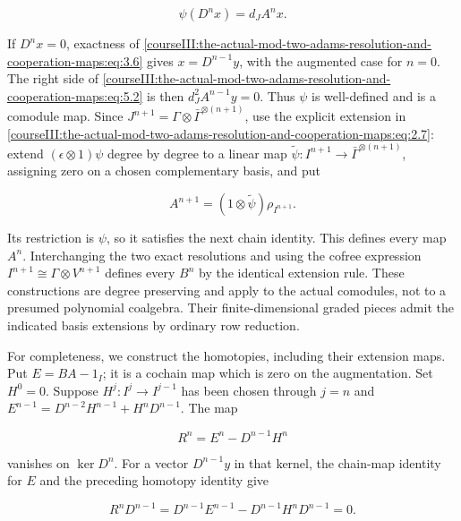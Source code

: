 \begin{equation}
\psi(D^n x)=d_JA^n x.
 \label{courseIII:the-actual-mod-two-adams-resolution-and-cooperation-maps:eq:5.2}
\end{equation}

If \(D^nx=0\), exactness of \eqref{courseIII:the-actual-mod-two-adams-resolution-and-cooperation-maps:eq:3.6} gives \(x=D^{n-1}y\), with the augmented case for \(n=0\). The right side of \eqref{courseIII:the-actual-mod-two-adams-resolution-and-cooperation-maps:eq:5.2} is then \(d_J^2A^{n-1}y=0\). Thus \(\psi\) is well-defined and is a comodule map. Since \(J^{n+1}=\Gamma\otimes\bar\Gamma^{\otimes(n+1)}\), use the explicit extension in \eqref{courseIII:the-actual-mod-two-adams-resolution-and-cooperation-maps:eq:2.7}: extend \((\epsilon\otimes1)\psi\) degree by degree to a linear map \(\widetilde\psi:I^{n+1}\to\bar\Gamma^{\otimes(n+1)}\), assigning zero on a chosen complementary basis, and put

\begin{equation}
A^{n+1}=(1\otimes\widetilde\psi)\rho_{I^{n+1}}.
 \label{courseIII:the-actual-mod-two-adams-resolution-and-cooperation-maps:eq:5.3}
\end{equation}

Its restriction is \(\psi\), so it satisfies the next chain identity. This defines every map \(A^n\). Interchanging the two exact resolutions and using the cofree expression \(I^{n+1}\cong\Gamma\otimes V^{n+1}\) defines every \(B^n\) by the identical extension rule. These constructions are degree preserving and apply to the actual comodules, not to a presumed polynomial coalgebra. Their finite-dimensional graded pieces admit the indicated basis extensions by ordinary row reduction.

For completeness, we construct the homotopies, including their extension maps. Put \(E=BA-1_I\); it is a cochain map which is zero on the augmentation. Set \(H^0=0\). Suppose \(H^j:I^j\to I^{j-1}\) has been chosen through \(j=n\) and
\(E^{n-1}=D^{n-2}H^{n-1}+H^nD^{n-1}\).
The map

\begin{equation}
R^n=E^n-D^{n-1}H^n
 \label{courseIII:the-actual-mod-two-adams-resolution-and-cooperation-maps:eq:5.4}
\end{equation}

vanishes on \(\ker D^n\). For a vector \(D^{n-1}y\) in that kernel, the chain-map identity for \(E\) and the preceding homotopy identity give

\begin{equation}
R^nD^{n-1}
  =D^{n-1}E^{n-1}-D^{n-1}H^nD^{n-1}=0.
 \label{courseIII:the-actual-mod-two-adams-resolution-and-cooperation-maps:eq:5.5}
\end{equation}

